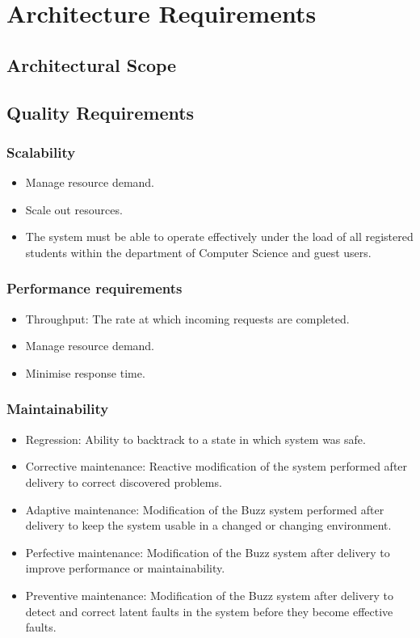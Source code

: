 \documentclass[12pt, oneside]{article}
\begin{document}
\section{Architecture Requirements}
	\subsection{Architectural Scope}
	\subsection{Quality Requirements}
		\subsubsection{Scalability}
			\begin{itemize} 
				\item Manage resource demand.
				\item Scale out resources.
				\item The system must be able to operate effectively under the load of all registered students within the department of Computer Science and guest users.
			\end{itemize}
			
		\subsubsection{Performance requirements}
			\begin{itemize}
				\item Throughput: The rate at which incoming requests are completed.
				\item Manage resource demand.
				\item Minimise response time.
			\end{itemize}
		\subsubsection{Maintainability}
			\begin{itemize}
					\item Regression: Ability to backtrack to a state in which system was safe.
					\item Corrective maintenance: Reactive modification of the system performed after delivery to correct discovered problems.
					\item Adaptive maintenance: Modification of the Buzz system performed after delivery to keep the system usable in a changed or changing environment.
					\item Perfective maintenance: Modification of the Buzz system after delivery to improve performance or maintainability.
					\item Preventive maintenance: Modification of the Buzz system after delivery to detect and correct latent faults in the system before they become effective faults.
			\end{itemize}
\end{document}
